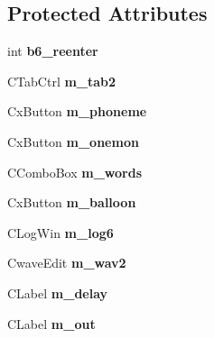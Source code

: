 \subsection*{Protected Attributes}
\begin{DoxyCompactItemize}
\item 
\hypertarget{class_c_wavfrag_dlg_a810f7917876e0a2f20f41e88345bad77}{int {\bfseries b6\-\_\-reenter}}\label{class_c_wavfrag_dlg_a810f7917876e0a2f20f41e88345bad77}

\item 
\hypertarget{class_c_wavfrag_dlg_ac969e443087d3ff4f36ae45501a8884d}{C\-Tab\-Ctrl {\bfseries m\-\_\-tab2}}\label{class_c_wavfrag_dlg_ac969e443087d3ff4f36ae45501a8884d}

\item 
\hypertarget{class_c_wavfrag_dlg_aa8375c137f0701c5b52d8f4dc327505f}{Cx\-Button {\bfseries m\-\_\-phoneme}}\label{class_c_wavfrag_dlg_aa8375c137f0701c5b52d8f4dc327505f}

\item 
\hypertarget{class_c_wavfrag_dlg_ad71f2915949c70cdd4a801b10c58f6e3}{Cx\-Button {\bfseries m\-\_\-onemon}}\label{class_c_wavfrag_dlg_ad71f2915949c70cdd4a801b10c58f6e3}

\item 
\hypertarget{class_c_wavfrag_dlg_af146e7ff3dc7ea0f9a4b0a13183de602}{C\-Combo\-Box {\bfseries m\-\_\-words}}\label{class_c_wavfrag_dlg_af146e7ff3dc7ea0f9a4b0a13183de602}

\item 
\hypertarget{class_c_wavfrag_dlg_a71daea4642bcf95c3ec48b6e04f26111}{Cx\-Button {\bfseries m\-\_\-balloon}}\label{class_c_wavfrag_dlg_a71daea4642bcf95c3ec48b6e04f26111}

\item 
\hypertarget{class_c_wavfrag_dlg_a51516c6903932b5ffc7a87fc0b21ba39}{C\-Log\-Win {\bfseries m\-\_\-log6}}\label{class_c_wavfrag_dlg_a51516c6903932b5ffc7a87fc0b21ba39}

\item 
\hypertarget{class_c_wavfrag_dlg_a2440c67fa1e06d52b8f8186d198e44f8}{Cwave\-Edit {\bfseries m\-\_\-wav2}}\label{class_c_wavfrag_dlg_a2440c67fa1e06d52b8f8186d198e44f8}

\item 
\hypertarget{class_c_wavfrag_dlg_a13f84360ab2a0cecd7a8da33e30475ff}{C\-Label {\bfseries m\-\_\-delay}}\label{class_c_wavfrag_dlg_a13f84360ab2a0cecd7a8da33e30475ff}

\item 
\hypertarget{class_c_wavfrag_dlg_a1d259ad086c7bf973fdedf007565ec18}{C\-Label {\bfseries m\-\_\-out}}\label{class_c_wavfrag_dlg_a1d259ad086c7bf973fdedf007565ec18}


\end{DoxyCompactItemize}

